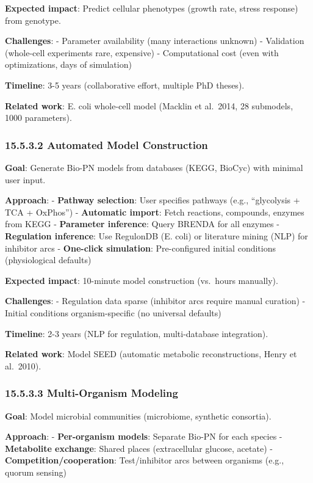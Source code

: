 \textbf{Expected impact}: Predict cellular phenotypes (growth rate,
stress response) from genotype.

\textbf{Challenges}: - Parameter availability (many interactions
unknown) - Validation (whole-cell experiments rare, expensive) -
Computational cost (even with optimizations, days of simulation)

\textbf{Timeline}: 3-5 years (collaborative effort, multiple PhD
theses).

\textbf{Related work}: E. coli whole-cell model (Macklin et al.~2014, 28
submodels, 1000 parameters).

\hypertarget{automated-model-construction}{%
\subsubsection{15.5.3.2 Automated Model
Construction}\label{automated-model-construction}}

\textbf{Goal}: Generate Bio-PN models from databases (KEGG, BioCyc) with
minimal user input.

\textbf{Approach}: - \textbf{Pathway selection}: User specifies pathways
(e.g., ``glycolysis + TCA + OxPhos'') - \textbf{Automatic import}: Fetch
reactions, compounds, enzymes from KEGG - \textbf{Parameter inference}:
Query BRENDA for all enzymes - \textbf{Regulation inference}: Use
RegulonDB (E. coli) or literature mining (NLP) for inhibitor arcs -
\textbf{One-click simulation}: Pre-configured initial conditions
(physiological defaults)

\textbf{Expected impact}: 10-minute model construction (vs.~hours
manually).

\textbf{Challenges}: - Regulation data sparse (inhibitor arcs require
manual curation) - Initial conditions organism-specific (no universal
defaults)

\textbf{Timeline}: 2-3 years (NLP for regulation, multi-database
integration).

\textbf{Related work}: Model SEED (automatic metabolic reconstructions,
Henry et al.~2010).

\hypertarget{multi-organism-modeling}{%
\subsubsection{15.5.3.3 Multi-Organism
Modeling}\label{multi-organism-modeling}}

\textbf{Goal}: Model microbial communities (microbiome, synthetic
consortia).

\textbf{Approach}: - \textbf{Per-organism models}: Separate Bio-PN for
each species - \textbf{Metabolite exchange}: Shared places
(extracellular glucose, acetate) - \textbf{Competition/cooperation}:
Test/inhibitor arcs between organisms (e.g., quorum sensing)

